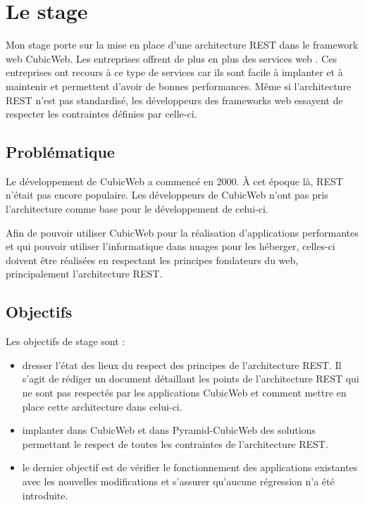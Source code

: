 \chapter{Le stage} 
Mon stage porte sur la mise en place d'une architecture REST dans le framework 
web CubicWeb. Les entreprises offrent de plus en plus des services web 
. Ces entreprises ont recours à ce type de services car ils 
sont facile à implanter et à maintenir et permettent d'avoir de bonnes 
performances. Même si l'architecture REST n'est pas standardisé, les développeurs 
des frameworks web essayent de respecter les contraintes définies par celle-ci.   

\section{Problématique} Le développement de CubicWeb a commencé en 2000. \`A cet 
époque là, REST n'était pas encore populaire. Les développeurs de CubicWeb n'ont 
pas pris l'architecture comme base pour le développement de celui-ci.  

Afin de pouvoir utiliser CubicWeb pour la réalisation d'applications performantes 
et qui pouvoir utiliser l'informatique dans nuages pour les héberger, celles-ci 
doivent être réalisées en respectant les principes fondateurs du web, principalement 
l'architecture REST.


\section{Objectifs} 
Les objectifs de stage sont : 

\begin{itemize} 
    \item dresser l'état des lieux du respect des principes de l'architecture REST.
        Il s'agit de rédiger un document détaillant les points de l'architecture REST 
        qui ne sont pas respectés par les applications CubicWeb et comment mettre en 
        place cette architecture dans celui-ci.
	
    \item implanter dans CubicWeb et dans Pyramid-CubicWeb des solutions
        permettant le respect de toutes les contraintes de l'architecture REST. 
	
    \item le dernier objectif est de vérifier le fonctionnement des applications 
        existantes avec les nouvelles modifications et s'assurer qu'aucune régression 
        n'a été introduite.  
\end{itemize}
